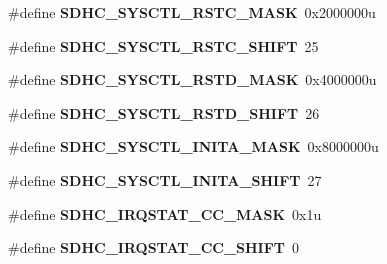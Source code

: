 \begin{DoxyCompactItemize}
\item 
\hypertarget{group___s_d_h_c___register___masks_ga10f1184a683dcb78737e3620660d6b62}{}\#define {\bfseries S\+D\+H\+C\+\_\+\+S\+Y\+S\+C\+T\+L\+\_\+\+R\+S\+T\+C\+\_\+\+M\+A\+S\+K}~0x2000000u\label{group___s_d_h_c___register___masks_ga10f1184a683dcb78737e3620660d6b62}

\item 
\hypertarget{group___s_d_h_c___register___masks_ga3d422fd7f88100a1e5ec873d8d670792}{}\#define {\bfseries S\+D\+H\+C\+\_\+\+S\+Y\+S\+C\+T\+L\+\_\+\+R\+S\+T\+C\+\_\+\+S\+H\+I\+F\+T}~25\label{group___s_d_h_c___register___masks_ga3d422fd7f88100a1e5ec873d8d670792}

\item 
\hypertarget{group___s_d_h_c___register___masks_ga920797e969967edc2e737c8db7ce92aa}{}\#define {\bfseries S\+D\+H\+C\+\_\+\+S\+Y\+S\+C\+T\+L\+\_\+\+R\+S\+T\+D\+\_\+\+M\+A\+S\+K}~0x4000000u\label{group___s_d_h_c___register___masks_ga920797e969967edc2e737c8db7ce92aa}

\item 
\hypertarget{group___s_d_h_c___register___masks_ga1997ff19d3faec07899352f7ca6c0ad8}{}\#define {\bfseries S\+D\+H\+C\+\_\+\+S\+Y\+S\+C\+T\+L\+\_\+\+R\+S\+T\+D\+\_\+\+S\+H\+I\+F\+T}~26\label{group___s_d_h_c___register___masks_ga1997ff19d3faec07899352f7ca6c0ad8}

\item 
\hypertarget{group___s_d_h_c___register___masks_ga2a115ba3d13885e273f8113ee502beb3}{}\#define {\bfseries S\+D\+H\+C\+\_\+\+S\+Y\+S\+C\+T\+L\+\_\+\+I\+N\+I\+T\+A\+\_\+\+M\+A\+S\+K}~0x8000000u\label{group___s_d_h_c___register___masks_ga2a115ba3d13885e273f8113ee502beb3}

\item 
\hypertarget{group___s_d_h_c___register___masks_ga2567891a05c79b0dc5fe49160972a448}{}\#define {\bfseries S\+D\+H\+C\+\_\+\+S\+Y\+S\+C\+T\+L\+\_\+\+I\+N\+I\+T\+A\+\_\+\+S\+H\+I\+F\+T}~27\label{group___s_d_h_c___register___masks_ga2567891a05c79b0dc5fe49160972a448}

\item 
\hypertarget{group___s_d_h_c___register___masks_ga10719f3e788158bad229768076234b23}{}\#define {\bfseries S\+D\+H\+C\+\_\+\+I\+R\+Q\+S\+T\+A\+T\+\_\+\+C\+C\+\_\+\+M\+A\+S\+K}~0x1u\label{group___s_d_h_c___register___masks_ga10719f3e788158bad229768076234b23}

\item 
\hypertarget{group___s_d_h_c___register___masks_gab120e3f02ed57b1188dfd2f3b89f324b}{}\#define {\bfseries S\+D\+H\+C\+\_\+\+I\+R\+Q\+S\+T\+A\+T\+\_\+\+C\+C\+\_\+\+S\+H\+I\+F\+T}~0\label{group___s_d_h_c___register___masks_gab120e3f02ed57b1188dfd2f3b89f324b}


\end{DoxyCompactItemize}
